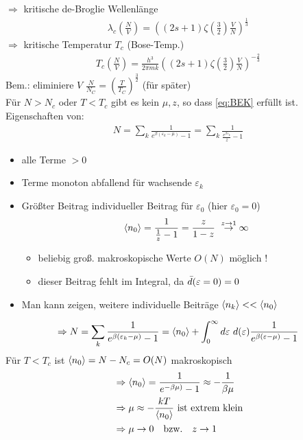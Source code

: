 $\Rightarrow$ kritische de-Broglie Wellenlänge
\begin{align}
    \lambda_c\left(\frac{N}{V}\right) = \left((2s+1) \zeta\left(\frac{3}{2}\right) \frac{V}{N}\right)^{\frac{1}{3}}
\end{align}
$\Rightarrow$ kritische Temperatur $T_c$ (Bose-Temp.)
\begin{align}
    T_c\left(\frac{N}{V}\right) = \frac{h^3}{2\pi mk} \left((2s+1) \zeta\left(\frac{3}{2}\right) \frac{V}{N}\right)^{-\frac{2}{3}}
\end{align}
Bem.: eliminiere $V$ $\frac{N}{N_C}=\left(\frac{T}{T_C}\right)^{\frac{3}{2}}$ (für später)\\
Für $N>N_c$ oder $T< T_c$ gibt es kein $\mu,z$, so dass \ref{eq:BEK} erfüllt ist.\\
Eigenschaften von:
\begin{align}
    N = \sum_k \frac{1}{e^{\beta(\varepsilon_k-\mu)}-1} = \sum_k \frac{1}{\frac{e^{\beta \varepsilon_k}}{z}-1}
\end{align}
\begin{itemize}
    \item alle Terme $>0$
    \item Terme monoton abfallend für wachsende  $\varepsilon_k$
    \item Größter Beitrag individueller Beitrag für $ \varepsilon_0$ (hier $\varepsilon_0=0$)
        \begin{align}
            \expval{n_0}=\frac{1}{\frac{1}{z}-1}= \frac{z}{1-z} \ \overset{z \rightarrow 1}{\rightarrow} \infty
        \end{align}
        \begin{itemize}
            \item beliebig groß. makroskopische Werte $O(N)$ möglich !
            \item dieser Beitrag fehlt im Integral, da $\Bar{d}(\varepsilon=0)=0$
        \end{itemize}
    \item Man kann zeigen, weitere individuelle Beiträge $\expval{n_k} << \expval{n_0}$
\end{itemize}
\begin{align}
    \Rightarrow N= \sum_k \frac{1}{e^{\beta(\varepsilon_k-\mu)}-1} = \expval{n_0} + \int_0^\infty d\varepsilon \ d(\varepsilon) \frac{1}{e^{\beta(\varepsilon-\mu)}-1}
\end{align}
Für $T<T_c$ ist $\expval{n_0}=N-N_c= O(N)$ makroskopisch\\
\begin{align}
    &\Rightarrow \expval{n_0} = \frac{1}{e^{-\beta\mu)}-1} \approx -\frac{1}{\beta\mu}\\
    &\Rightarrow \mu \approx -\frac{kT}{\expval{n_0}} \text{ ist extrem klein}\\
    &\Rightarrow \mu \to 0 \qq{bzw.} z \to 1
\end{align}
